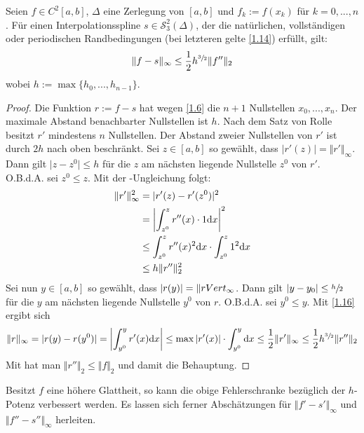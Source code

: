 \begin{proposition}
	Seien $f\in C^2[a,b]$, $\Delta$ eine Zerlegung von $[a,b]$ und $f_k:=f(x_k)$ für $k=0,...,n$. Für einen Interpolationsspline $s\in\mathcal{S}^2_3(\Delta)$, der die natürlichen, vollständigen oder periodischen Randbedingungen (bei letzteren gelte \cref{1.14}) erfüllt, gilt:
	\begin{align}
		\Vert f-s\Vert_\infty \le \frac{1}{2}h^{\sfrac{3}{2}}\Vert f''\Vert_2\notag
	\end{align}
	wobei $h:=\max\{h_0,...,h_{n-1}\}$.
\end{proposition}
\begin{proof}
	Die Funktion $r:=f-s$ hat wegen \cref{1.6} die $n+1$ Nullstellen $x_0,...,x_n$. Der maximale Abstand benachbarter Nullstellen ist $h$. Nach dem Satz von Rolle besitzt $r'$ mindestens $n$ Nullstellen. Der Abstand zweier Nullstellen von $r'$ ist durch $2h$ nach oben beschränkt. Sei $z\in [a,b]$ so gewählt, dass $\vert r'(z)\vert=\Vert r'\Vert_\infty$. Dann gilt $\vert z-z^0\vert\le h$ für die $z$ am nächsten liegende Nullstelle $z^0$ von $r'$. O.B.d.A. sei $z^0\le z$. Mit der -Ungleichung folgt:
	\begin{align}
		\Vert r'\Vert_\infty^2 &= \vert r'(z)-r'(z^0)\vert^2 \notag \\
		\label{1.16}
		&= \left|\int_{z^0}^z r''(x)\cdot 1\mathrm{d} x\right|^2  \\
		&\le \int_{z^0}^z r''(x)^2\mathrm{d} x\cdot \int_{z^0}^z 1^2\mathrm{d} x\notag \\
		&\le h\Vert r''\Vert_2^2\notag
	\end{align}
	Sei nun $y\in[a,b]$ so gewählt, dass $\vert r(y)\vert=\Vert r\\Vert_\infty$. Dann gilt $\vert y-y_0\vert\le \sfrac{h}{2}$ für die $y$ am nächsten liegende Nullstelle $y^0$ von $r$. O.B.d.A. sei $y^0\le y$. Mit \cref{1.16} ergibt sich
	\begin{align}
		\Vert r\Vert_\infty = \vert r(y)-r(y^0)\vert=\left|\int_{y^0}^y r'(x)\mathrm{d} x\right|\le\max\vert r'(x)\vert\cdot \int_{y^0}^y \mathrm{d} x\le \frac{1}{2}\Vert r'\Vert_\infty\le \frac{1}{2}h^{\sfrac{3}{2}}\Vert r''\Vert_2\notag
	\end{align}
	Mit  hat man $\Vert r''\Vert_2\le \Vert f\Vert_2$ und damit die Behauptung.
\end{proof}

\begin{remark}
	Besitzt $f$ eine höhere Glattheit, so kann die obige Fehlerschranke bezüglich der $h$-Potenz verbessert werden. Es lassen sich ferner Abschätzungen für $\Vert f'-s'\Vert_\infty$ und $\Vert f''-s''\Vert_\infty$ herleiten.
\end{remark}
